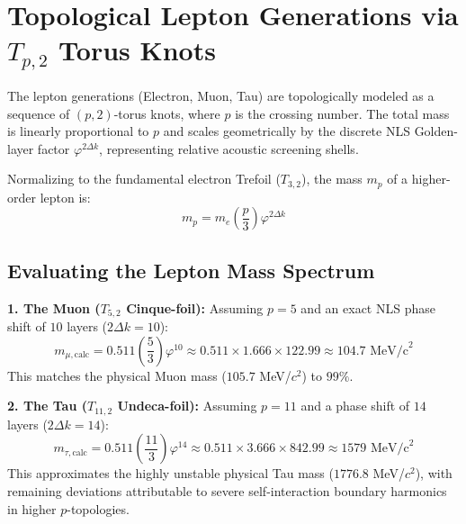 \documentclass[11pt]{article}
\begin{document}
    \section{Topological Lepton Generations via $T_{p,2}$ Torus Knots}
        \label{sec:torus_knots}

        The lepton generations (Electron, Muon, Tau) are topologically modeled as a sequence of $(p,2)$-torus knots, where $p$ is the crossing number. The total mass is linearly proportional to $p$ and scales geometrically by the discrete NLS Golden-layer factor $\varphi^{2\Delta k}$, representing relative acoustic screening shells.

        Normalizing to the fundamental electron Trefoil ($T_{3,2}$), the mass $m_p$ of a higher-order lepton is:
        \begin{equation}
            m_p = m_e \left( \frac{p}{3} \right) \varphi^{2\Delta k}
        \end{equation}

        \subsection{Evaluating the Lepton Mass Spectrum}

            \textbf{1. The Muon ($T_{5,2}$ Cinque-foil):}
            Assuming $p=5$ and an exact NLS phase shift of $10$ layers ($2\Delta k = 10$):
            \begin{equation}
                m_{\mu,\text{calc}} = 0.511 \left( \frac{5}{3} \right) \varphi^{10} \approx 0.511 \times 1.666 \times 122.99 \approx 104.7 \text{ MeV/c}^2
            \end{equation}
            This matches the physical Muon mass ($105.7$ MeV/$c^2$) to $99\%$.

            \textbf{2. The Tau ($T_{11,2}$ Undeca-foil):}
            Assuming $p=11$ and a phase shift of $14$ layers ($2\Delta k = 14$):
            \begin{equation}
                m_{\tau,\text{calc}} = 0.511 \left( \frac{11}{3} \right) \varphi^{14} \approx 0.511 \times 3.666 \times 842.99 \approx 1579 \text{ MeV/c}^2
            \end{equation}
            This approximates the highly unstable physical Tau mass ($1776.8$ MeV/$c^2$), with remaining deviations attributable to severe self-interaction boundary harmonics in higher $p$-topologies.
\end{document}
